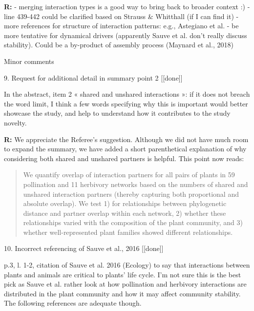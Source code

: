 \documentclass[12pt]{letter}
\newenvironment{refquote}{\bigskip \begin{it}}{\end{it}\smallskip}
\begin{document}
	\textbf{R:} - merging interaction types is a good way to bring back to broader context :) - line 439-442 could be clarified based on Strauss & Whitthall (if I can find it) - more references for structure of interaction patterns: e.g., Astegiano et al. - be more tentative for dynamical drivers (apparently Sauve et al. don't really discuss stability). Could be a by-product of assembly process (Maynard et al., 2018)


Minor comments

9. Request for additional detail in summary point 2 [[done]]

	\begin{refquote}
		In the abstract, item 2 « shared and unshared interactions »: if it does not breach the word limit, I think a few words specifying why this is important would better showcase the study, and help to understand how it contributes to the study novelty.
	\end{refquote}

	\textbf{R:} We appreciate the Referee's suggestion. Although we did not have much room to expand the summary, we have added a short parenthetical explanation of why considering both shared and unshared partners is helpful. This point now reads:

	\begin{quotation}

		\item We quantify overlap of interaction partners for all pairs of plants in 59 pollination and 11 herbivory networks based on the numbers of shared and unshared interaction partners (thereby capturing both proportional and absolute overlap). We test 1) for relationships between phylogenetic distance and partner overlap within each network, 2) whether these relationships varied with the composition of the plant community, and 3) whether well-represented plant families showed different relationships. 

	\end{quotation}


10. Incorrect referencing of Sauve et al., 2016 [[done]]

	\begin{refquote}
		p.3, l. 1-2, citation of Sauve et al. 2016 (Ecology) to say that interactions between plants and animals are critical to plants’ life cycle. I’m not sure this is the best pick as Sauve et al. rather look at how pollination and herbivory interactions are distributed in the plant community and how it may affect community stability. The following references are adequate though.
	\end{refquote}
\end{document}
